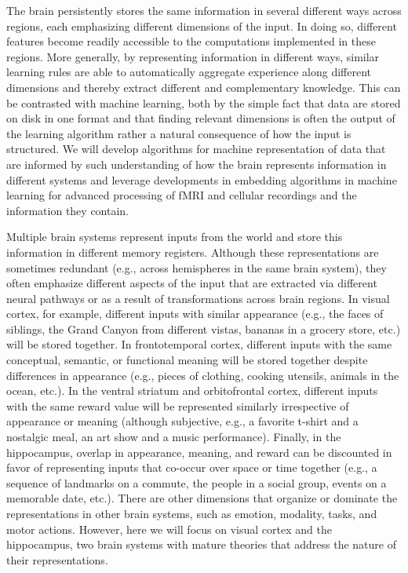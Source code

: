 \let\tilde\widetilde
\def\SS{{\mathbb S}}
\def\X{{\mathbb X}}
\def\bb{b}
\def\noisesd{\sigma}
\def\C{{\mathcal C}}
\def\A{{\mathcal A}}
\def\bigbracket#1#2#3{
\left[ 
\mbox{\begin{minipage}{#1}{
\vskip#2
#3
\vskip#2
\mbox{\ }
}\end{minipage}}
\right]
}

\label{sec:aim2}

The brain persistently stores the same information in several
different ways across regions, each emphasizing different dimensions
of the input. In doing so, different features become readily
accessible to the computations implemented in these regions. More
generally, by representing information in different ways, similar
learning rules are able to automatically aggregate experience along
different dimensions and thereby extract different and complementary
knowledge. This can be contrasted with machine learning, both by the
simple fact that data are stored on disk in one format and that
finding relevant dimensions is often the output of the learning
algorithm rather a natural consequence of how the input is structured.
We will develop algorithms for machine representation of data that are
informed by such understanding of how the brain represents information
in different systems and leverage developments in embedding algorithms
in machine learning for advanced processing of fMRI and cellular
recordings and the information they contain.

\biobackground{} Multiple brain systems represent inputs from the
world and store this information in different memory registers.
Although these representations are sometimes redundant (e.g., across
hemispheres in the same brain system), they often emphasize different
aspects of the input that are extracted via different neural pathways
or as a result of transformations across brain regions. In visual
cortex, for example, different inputs with similar appearance (e.g.,
the faces of siblings, the Grand Canyon from different vistas, bananas
in a grocery store, etc.) will be stored together. In frontotemporal
cortex, different inputs with the same conceptual, semantic, or
functional meaning will be stored together despite differences in
appearance (e.g., pieces of clothing, cooking utensils, animals in the
ocean, etc.). In the ventral striatum and orbitofrontal cortex,
different inputs with the same reward value will be represented
similarly irrespective of appearance or meaning (although subjective,
e.g., a favorite t-shirt and a nostalgic meal, an art show and a music
performance). Finally, in the hippocampus, overlap in appearance,
meaning, and reward can be discounted in favor of representing inputs
that co-occur over space or time together (e.g., a sequence of
landmarks on a commute, the people in a social group, events on a
memorable date, etc.). There are other dimensions that organize or
dominate the representations in other brain systems, such as emotion,
modality, tasks, and motor actions. However, here we will focus on
visual cortex and the hippocampus, two brain systems with mature
theories that address the nature of their representations.

